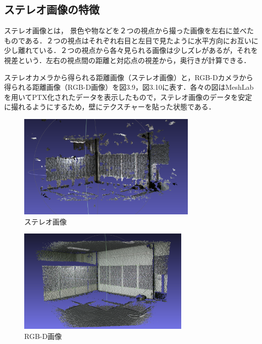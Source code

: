 \subsection{ステレオ画像の特徴}
ステレオ画像とは， 景色や物などを２つの視点から撮った画像を左右に並べたものである．２つの視点はそれぞれ右目と左目で見たように水平方向にお互いに少し離れている．２つの視点から各々見られる画像は少しズレがあるが，それを視差という．左右の視点間の距離と対応点の視差から，奥行きが計算できる．

ステレオカメラから得られる距離画像（ステレオ画像）と，RGB-Dカメラから得られる距離画像（RGB-D画像）を図3.9，図3.10に表す．各々の図はMeshLabを用いてPTX化されたデータを表示したもので，ステレオ画像のデータを安定に撮れるようにするため，壁にテクスチャーを貼った状態である．\\

\begin{figure}[ht]
  \begin{center}
   \includegraphics[height=50mm]{figure/ステレオ画像.eps}
   \caption{ステレオ画像}
   \label{ステレオ画像}
  \end{center}
\end{figure}

\begin{figure}[h]
  \begin{center}
   \includegraphics[height=50mm]{figure/RGB-D画像.eps}
   \caption{RGB-D画像}
   \label{RGB-D画像}
  \end{center}
\end{figure}

